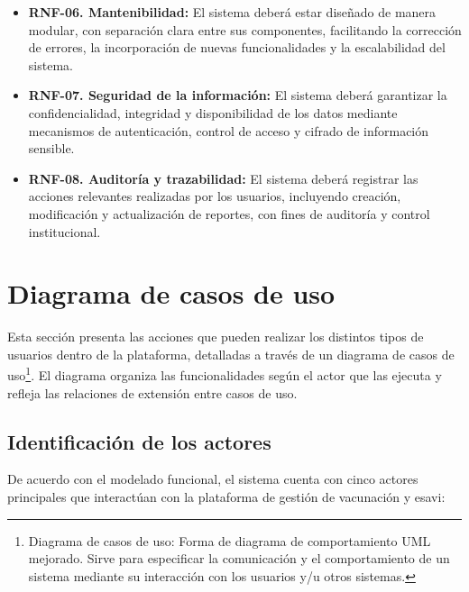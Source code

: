 \begin{itemize}
\item \textbf{RNF-06. Mantenibilidad:}  
El sistema deberá estar diseñado de manera modular, con separación clara entre sus componentes, facilitando la corrección de errores, la incorporación de nuevas funcionalidades y la escalabilidad del sistema.

\item \textbf{RNF-07. Seguridad de la información:}  
El sistema deberá garantizar la confidencialidad, integridad y disponibilidad de los datos mediante mecanismos de autenticación, control de acceso y cifrado de información sensible.

\item \textbf{RNF-08. Auditoría y trazabilidad:}  
El sistema deberá registrar las acciones relevantes realizadas por los usuarios, incluyendo creación, modificación y actualización de reportes, con fines de auditoría y control institucional.

\end{itemize}


\section{Diagrama de casos de uso}
\label{section:casos_uso}

Esta sección presenta las acciones que pueden realizar los distintos tipos de usuarios dentro de la plataforma, detalladas a través de un diagrama de casos de uso\footnote{Diagrama de casos de uso: Forma de diagrama de comportamiento UML mejorado. Sirve para especificar la comunicación y el comportamiento de un sistema mediante su interacción con los usuarios y/u otros sistemas.}. 
El diagrama organiza las funcionalidades según el actor que las ejecuta y refleja las relaciones de extensión entre casos de uso.

\subsection{Identificación de los actores}

De acuerdo con el modelado funcional, el sistema cuenta con cinco actores principales que interactúan con la plataforma de gestión de vacunación y \gls{esavi}:

